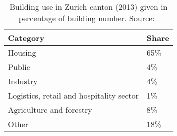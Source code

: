 \begin{table}[h!]
	\centering
	\caption{Building use in Zurich canton (2013) given in percentage of building number. Source:~\cite{endk-konferenzkantonalerenergiedirektorenEnergieverbrauchGebaudenFact2014}}\vspace{2mm}
	\label{tab:BU_ZH} 
	\begin{tabular}{ll} \toprule
		Category & Share \\ \midrule
		Housing & 65\% \\
		Public & 4\% \\
		Industry & 4\% \\
		Logistics, retail and hospitality sector & 1\% \\
		Agriculture and forestry & 8\% \\
		Other & 18\% \\
		\bottomrule
	\end{tabular}	
\end{table}
